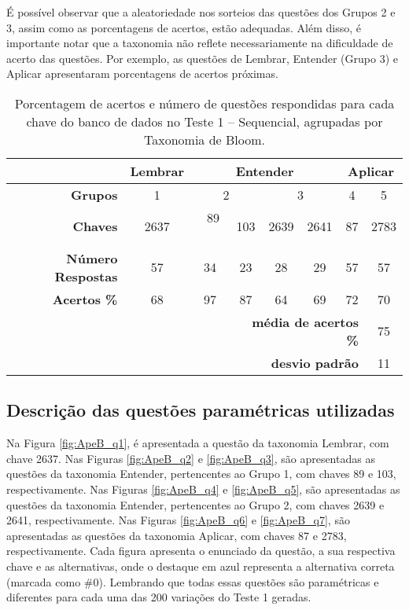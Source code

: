 É possível observar que a aleatoriedade nos sorteios das questões dos Grupos 2 e 3, assim como as porcentagens de acertos, estão adequadas. Além disso, é importante notar que a taxonomia não reflete necessariamente na dificuldade de acerto das questões. Por exemplo, as questões de Lembrar, Entender (Grupo 3) e Aplicar apresentaram porcentagens de acertos próximas.

\begin{table}[!ht]
    \centering
    \caption{Porcentagem de acertos e número de questões respondidas para cada chave do banco de dados no Teste 1 -- Sequencial, agrupadas por Taxonomia de Bloom.}
    \label{tab:respostas_atualizada}
    \begin{tabular}{|r|c|c|c|c|c|c|c|}
        \hline
         & \multicolumn{1}{c|}{\cellcolor{green!25}\textbf{Lembrar}} & \multicolumn{4}{c|}{\cellcolor{yellow!25}\textbf{Entender}} & \multicolumn{2}{c|}{\cellcolor{red!25}\textbf{Aplicar}} \\ \hline
        \textbf{Grupos} & 1 & \multicolumn{2}{c|}{2} & \multicolumn{2}{c|}{3} & 4 & 5 \\
        \hline \rowcolor[HTML]{D9D9D9} 
        \textbf{Chaves} & 2637 & \ 89 \ & 103 & 2639 & 2641 & 87 & 2783 \\
        \textbf{Número Respostas} & 57 & 34 & 23 & 28 & 29 & 57 & 57 \\\rowcolor[HTML]{D9D9D9} 
        \textbf{Acertos \%} & 68 & 97 & 87 & 64 & 69 & 72 & 70 \\
        \hline
        \multicolumn{3}{r}{} & \multicolumn{4}{r}{\cellcolor[HTML]{F9CB9C}\textbf{média de acertos \%}} & \multicolumn{1}{c}{\cellcolor[HTML]{F9CB9C}75} \\ 
        \multicolumn{3}{r}{} & \multicolumn{4}{r}{\cellcolor[HTML]{F9CB9C}\textbf{desvio padrão}} & \multicolumn{1}{c}{\cellcolor[HTML]{F9CB9C}11} \\ 
    \end{tabular}
\end{table}

\subsection{Descrição das questões paramétricas utilizadas}\label{sec:questoesTeste1}

Na Figura \ref{fig:ApeB_q1}, é apresentada a questão da taxonomia Lembrar, com chave 2637. Nas Figuras \ref{fig:ApeB_q2} e \ref{fig:ApeB_q3}, são apresentadas as questões da taxonomia Entender, pertencentes ao Grupo 1, com chaves 89 e 103, respectivamente. Nas Figuras \ref{fig:ApeB_q4} e \ref{fig:ApeB_q5}, são apresentadas as questões da taxonomia Entender, pertencentes ao Grupo 2, com chaves 2639 e 2641, respectivamente. Nas Figuras \ref{fig:ApeB_q6} e \ref{fig:ApeB_q7}, são apresentadas as questões da taxonomia Aplicar, com chaves 87 e 2783, respectivamente. Cada figura apresenta o enunciado da questão, a sua respectiva chave e as alternativas, onde o destaque em azul representa a alternativa correta (marcada como \#0). Lembrando que todas essas questões são paramétricas e diferentes para cada uma das 200 variações do Teste 1 geradas.

